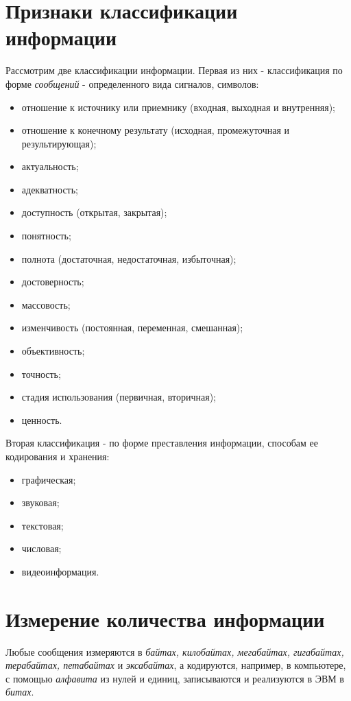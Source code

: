 \section{Признаки классификации информации}

Рассмотрим две классификации информации. Первая из них - классификация по форме \emph{сообщений} - определенного вида сигналов, символов:
\begin{itemize}
  \item отношение к источнику или приемнику (входная, выходная и внутренняя);
  \item отношение к конечному результату (исходная, промежуточная и результирующая);
  \item актуальность;
  \item адекватность;
  \item доступность (открытая, закрытая);
  \item понятность;
  \item полнота (достаточная, недостаточная, избыточная);
  \item достоверность;
  \item массовость;
  \item изменчивость (постоянная, переменная, смешанная);
  \item объективность;
  \item точность;
  \item стадия использования (первичная, вторичная);
  \item ценность.
\end{itemize}

Вторая классификация - по форме преставления информации, способам ее кодирования и хранения:
\begin{itemize}
  \item графическая;
  \item звуковая;
  \item текстовая;
  \item числовая;
  \item видеоинформация.
\end{itemize}

\section{Измерение количества информации}
Любые сообщения измеряются в \emph{байтах, килобайтах, мегабайтах, гигабайтах, терабайтах, петабайтах} и \emph{эксабайтах}, а кодируются, например, в компьютере, с помощью \emph{алфавита} из нулей и единиц, записываются и реализуются в ЭВМ в \emph{битах}.


